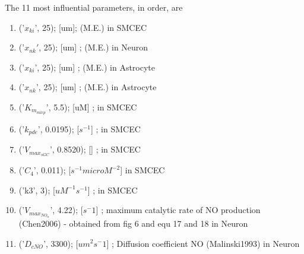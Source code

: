 \documentclass{article}
\begin{document}
The 11 most influential parameters, in order, are
\begin{enumerate}
\item ('$x_{ki}$', 25);  [um];  (M.E.) in SMCEC
\item ('$x_{nk}'$, 25);             [um] ;  (M.E.) in Neuron
\item ('$x_{ki}$', 25);             [um] ;  (M.E.) in Astrocyte
\item ('$x_{nk}$', 25);             [um] ;  (M.E.) in Astrocyte
\item  ('$K_{m_{mlcp}}$', 5.5);  [uM] ; in SMCEC
\item ('$k_{pde}$', 0.0195);  [$s^{-1}$] ; in SMCEC
\item  ('$V_{max_{sGC}}$', 0.8520);  [] ; in SMCEC
\item ('$C_4$', 0.011);  [$s^{-1} microM^{-2}$]  in SMCEC
\item ('k3', 3);  [$uM^{-1} s^{-1}$] ; in SMCEC
\item ('$V_{max_{NO_{n}}}$', 4.22);     [$s^-1$] ; maximum catalytic rate of NO production (Chen2006) - obtained from fig 6 and equ 17 and 18 in Neuron
\item ('$D_{cNO}$', 3300);          [$um^2 s^-1$] ; Diffusion coefficient NO (Malinski1993) in Neuron
\end{enumerate}
\end{document}

